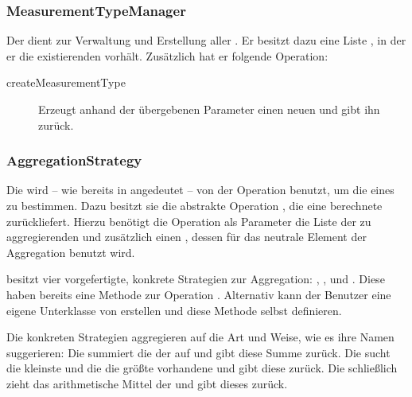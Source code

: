 \subsubsection{MeasurementTypeManager}
Der  dient zur Verwaltung und Erstellung aller . Er besitzt dazu eine Liste ,
in der er die existierenden  vorhält. Zusätzlich hat er folgende Operation:

\begin{description}
	\item[createMeasurementType] Erzeugt anhand der übergebenen Parameter einen neuen  und gibt ihn zurück.
\end{description}


\subsubsection{AggregationStrategy}
Die  wird -- wie bereits in  angedeutet -- von der Operation  benutzt,
um die  eines  zu bestimmen. Dazu besitzt sie die abstrakte Operation , die eine 
berechnete  zurückliefert. Hierzu benötigt die Operation als Parameter die Liste der zu aggregierenden  und
zusätzlich einen , dessen  für das neutrale Element der Aggregation benutzt wird. 

 besitzt vier vorgefertigte, konkrete Strategien zur Aggregation:
, ,  und
. Diese haben bereits eine Methode zur Operation . Alternativ
kann der Benutzer eine eigene Unterklasse von  erstellen und diese Methode selbst definieren.

Die konkreten Strategien aggregieren auf die Art und Weise, wie es ihre Namen suggerieren: Die
 summiert die  der  auf und gibt diese Summe zurück. Die
 sucht die kleinste und die  die größte vorhandene
 und gibt diese zurück. Die  schließlich zieht das arithmetische Mittel der
 und gibt dieses zurück.


